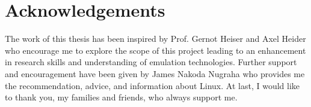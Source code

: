 \chapter*{Acknowledgements}\label{ack}

The work of this thesis has been inspired by Prof. Gernot Heiser and Axel Heider who encourage
me to explore the scope of this project leading to an enhancement in research skills
and understanding of emulation technologies. Further support and
encouragement have been given by James Nakoda Nugraha who provides me the recommendation, advice, and information about Linux. At last, I would like
to thank you, my families and friends, who always support me.
